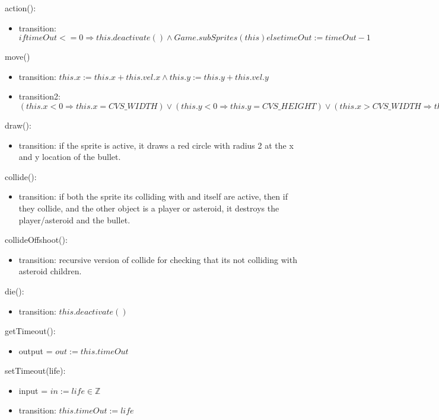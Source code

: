\documentclass[12pt]{article}
\begin{document}
\noindent action():
\begin{itemize}
    \item transition: $if timeOut <=0 \Rightarrow this.deactivate() \land Game.subSprites(this) else timeOut := timeOut - 1$
\end{itemize}

\noindent move()
\begin{itemize}
    \item transition: $this.x := this.x + this.vel.x \land this.y := this.y + this.vel.y$
    \item transition2: $(this.x < 0 \Rightarrow this.x = CVS\_WIDTH) \lor (this.y < 0 \Rightarrow this.y = CVS\_HEIGHT) \lor (this.x > CVS\_WIDTH \Rightarrow this.x = 0) \lor (this.y > CVS_HEIGHT \Rightarrow this.y = 0)$
\end{itemize}

\noindent draw():
\begin{itemize}
    \item transition: if the sprite is active, it draws a red circle with radius 2 at the x and y location of the bullet.
\end{itemize}

\noindent collide():
\begin{itemize}
    \item transition: if both the sprite its colliding with and itself are active, then if they collide, and the other object is a player or asteroid, it destroys the player/asteroid and the bullet.
\end{itemize}

\noindent collideOffshoot():
\begin{itemize}
    \item transition: recursive version of collide for checking that its not colliding with asteroid children.
\end{itemize}

\noindent die():
\begin{itemize}
    \item transition: $this.deactivate()$
\end{itemize}

\noindent getTimeout():
\begin{itemize}
    \item output = $out := this.timeOut$
\end{itemize}

\noindent setTimeout(life):
\begin{itemize}
    \item input = $in := life \in \mathbb{Z}$
    \item transition: $this.timeOut := life$
\end{itemize}
\end{document}
